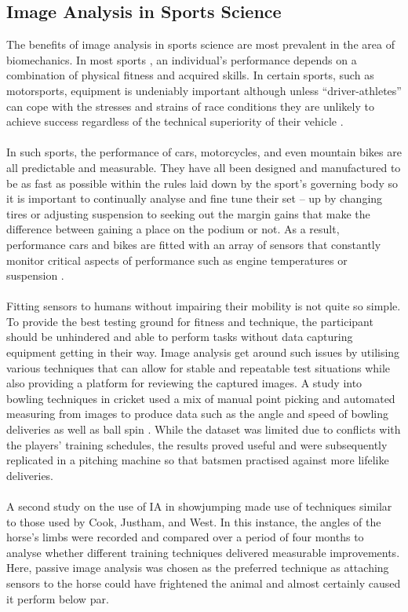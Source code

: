 \subsection{Image Analysis in Sports Science}
	The benefits of image analysis in sports science are most prevalent in the area of biomechanics. In most sports , an individual’s performance depends on a combination of physical fitness and acquired skills. In certain sports, such as motorsports, equipment is undeniably important although unless “driver-athletes” can cope with the stresses and strains of race conditions they are unlikely to achieve success regardless of the technical superiority of their vehicle \citep{klarica2001performance}.
	\\\\
	In such sports, the performance of cars, motorcycles, and even mountain bikes are all predictable and measurable. They have all been designed and manufactured to be as fast as possible within the rules laid down by the sport’s governing body so it is important to continually analyse and fine tune their set – up by changing tires or adjusting suspension to seeking out the margin gains that make the difference between gaining a place on the podium or not. As a result, performance cars and bikes are fitted with an array of sensors that constantly monitor critical aspects of performance such as engine temperatures or suspension \citep{segers2008analysis}. 
	\\\\
	Fitting sensors to humans without impairing their mobility is not quite so simple. To provide the best testing ground for fitness and technique, the participant should be unhindered and able to perform tasks without data capturing equipment getting in their way. Image analysis get around such issues by utilising various techniques that can allow for stable and repeatable test situations while also providing a platform for reviewing the captured images. A study into bowling techniques in cricket used a mix of manual point picking and automated measuring from images to produce data such as the angle and speed of bowling deliveries as well as ball spin \citep{cricketimaging}. While the dataset was limited due to conflicts with the players’ training schedules, the results proved useful and were subsequently replicated in a pitching machine so that batsmen practised against more lifelike deliveries.
	\\\\
	A second study on the use of IA in showjumping \citep{jumpyhorses} made use of techniques similar to those used by Cook, Justham, and West. In this instance, the angles of the horse’s limbs were recorded and compared over a period of four months to analyse whether different training techniques delivered measurable improvements. Here, passive image analysis was chosen as the preferred technique as attaching sensors to the horse could have frightened the animal and almost certainly caused it perform below par.